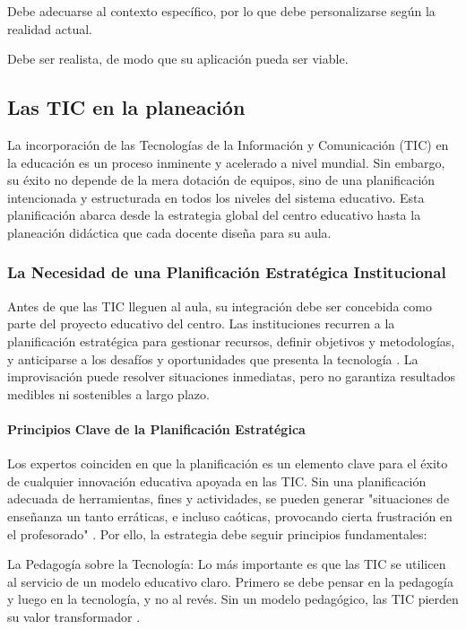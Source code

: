 Debe adecuarse al contexto específico, por lo que debe personalizarse según la realidad actual.

Debe ser realista, de modo que su aplicación pueda ser viable.

\subsection{Las TIC en la planeación}

La incorporación de las Tecnologías de la Información y Comunicación (TIC) en la educación es un proceso inminente y acelerado a nivel mundial. Sin embargo, su éxito no depende de la mera dotación de equipos, sino de una planificación intencionada y estructurada en todos los niveles del sistema educativo. Esta planificación abarca desde la estrategia global del centro educativo hasta la planeación didáctica que cada docente diseña para su aula.

\subsubsection{La Necesidad de una Planificación Estratégica Institucional}

Antes de que las TIC lleguen al aula, su integración debe ser concebida como parte del proyecto educativo del centro. Las instituciones recurren a la planificación estratégica para gestionar recursos, definir objetivos y metodologías, y anticiparse a los desafíos y oportunidades que presenta la tecnología \cite{laia2014}. La improvisación puede resolver situaciones inmediatas, pero no garantiza resultados medibles ni sostenibles a largo plazo.

\paragraph{Principios Clave de la Planificación Estratégica}

Los expertos coinciden en que la planificación es un elemento clave para el éxito de cualquier innovación educativa apoyada en las TIC. Sin una planificación adecuada de herramientas, fines y actividades, se pueden generar "situaciones de enseñanza un tanto erráticas, e incluso caóticas, provocando cierta frustración en el profesorado" \textcite{laia2014}. Por ello, la estrategia debe seguir principios fundamentales:

La Pedagogía sobre la Tecnología: Lo más importante es que las TIC se utilicen al servicio de un modelo educativo claro. Primero se debe pensar en la pedagogía y luego en la tecnología, y no al revés. Sin un modelo pedagógico, las TIC pierden su valor transformador \cite{laia2014}.

